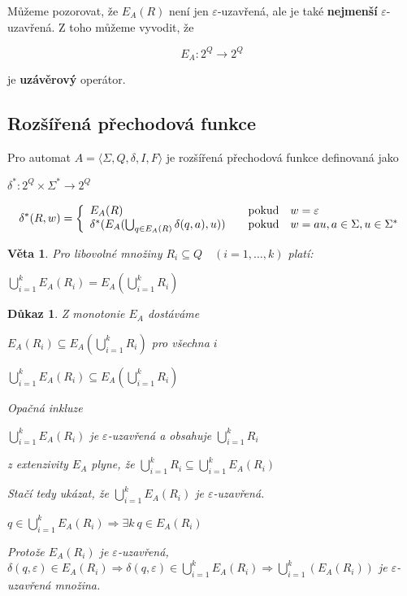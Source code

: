 \documentclass[10pt, a4paper, titlepage]{article}
\theoremstyle{note}
\newtheorem{veta}{\textbf{Věta}}
\newtheorem{dukaz}{\textbf{Důkaz}}
\begin{document}
Můžeme pozorovat, že $E_A(R)$ není jen $\varepsilon$-uzavřená, ale je také \textbf{nejmenší} $\varepsilon$-uzavřená. Z toho můžeme vyvodit, že 

$$E_A:2^Q \rightarrow 2^Q$$

je \textbf{uzávěrový} operátor.

\subsection{Rozšířená přechodová funkce}

Pro automat $A = \langle \Sigma,Q,\delta,I,F \rangle$ je rozšířená přechodová funkce definovaná jako

$\delta^*:2^Q \times \Sigma^* \rightarrow 2^Q$

$$
\delta^*(R,w)=\left\{
\begin{array}{l@{\quad\mbox{}\quad}l}
E_A(R) & \text{pokud}\quad w=\varepsilon\\
\delta^*(E_A(\bigcup_{q \in E_A(R)}\delta(q,a),u))& \text{pokud}\quad w=au,a\in\Sigma,u\in\Sigma^*\\
\end{array}
\right.
$$

\begin{veta}
Pro libovolné množiny $R_i \subseteq Q \quad (i=1,\ldots,k)$ platí:

$\bigcup_{i=1}^k E_A(R_i)=E_A(\bigcup_{i=1}^kR_i)$
\end{veta}

\begin{dukaz}
Z monotonie $E_A$ dostáváme

\quad$E_A(R_i) \subseteq E_A(\bigcup_{i=1}^k R_i)$ pro všechna $i$

\quad$\bigcup_{i=1}^kE_A(R_i) \subseteq E_A(\bigcup_{i=1}^k R_i)$

Opačná inkluze

\quad$\bigcup_{i=1}^kE_A(R_i)$ je $\varepsilon$-uzavřená a obsahuje $\bigcup_{i=1}^k R_i$

z extenzivity $E_A$ plyne, že $\bigcup_{i=1}^k R_i \subseteq \bigcup_{i=1}^k E_A(R_i)$

Stačí tedy ukázat, že $\bigcup_{i=1}^k E_A(R_i)$ je $\varepsilon$-uzavřená.

\quad$q \in \bigcup_{i=1}^k E_A(R_i) \Rightarrow \exists k \ q \in E_A(R_i)$

Protože $E_A(R_i)$ je $\varepsilon$-uzavřená, $\delta(q,\varepsilon) \in E_A(R_i) \Rightarrow \delta(q,\varepsilon) \in \bigcup_{i=1}^k E_A(R_i) \Rightarrow \bigcup_{i=1}^k(E_A(R_i))$ je $\varepsilon$-uzavřená množina.
\end{dukaz}
\end{document}
